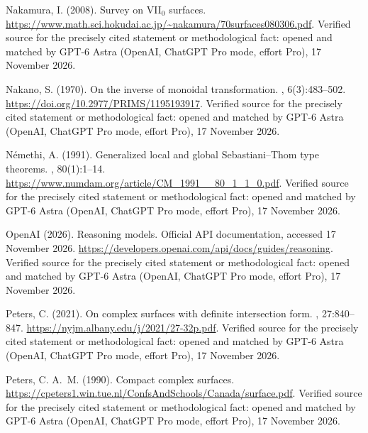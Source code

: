 \begin{thebibliography}{}
Nakamura, I. (2008).
\newblock Survey on {VII}$_0$ surfaces.
\newblock \url{https://www.math.sci.hokudai.ac.jp/~nakamura/70surfaces080306.pdf}. Verified source for the precisely cited statement or methodological fact: opened and matched by GPT-6 Astra (OpenAI, ChatGPT Pro mode, effort Pro), 17 November 2026.

Nakano, S. (1970).
\newblock On the inverse of monoidal transformation.
, 6(3):483--502.
\newblock \url{https://doi.org/10.2977/PRIMS/1195193917}. Verified source for the precisely cited statement or methodological fact: opened and matched by GPT-6 Astra (OpenAI, ChatGPT Pro mode, effort Pro), 17 November 2026.

N{\'e}methi, A. (1991).
\newblock Generalized local and global {Sebastiani--Thom} type theorems.
, 80(1):1--14.
\newblock \url{https://www.numdam.org/article/CM_1991__80_1_1_0.pdf}. Verified source for the precisely cited statement or methodological fact: opened and matched by GPT-6 Astra (OpenAI, ChatGPT Pro mode, effort Pro), 17 November 2026.

{OpenAI} (2026).
\newblock Reasoning models.
\newblock Official API documentation, accessed 17 November 2026.
\newblock \url{https://developers.openai.com/api/docs/guides/reasoning}. Verified source for the precisely cited statement or methodological fact: opened and matched by GPT-6 Astra (OpenAI, ChatGPT Pro mode, effort Pro), 17 November 2026.

Peters, C. (2021).
\newblock On complex surfaces with definite intersection form.
, 27:840--847.
\newblock \url{https://nyjm.albany.edu/j/2021/27-32p.pdf}. Verified source for the precisely cited statement or methodological fact: opened and matched by GPT-6 Astra (OpenAI, ChatGPT Pro mode, effort Pro), 17 November 2026.

Peters, C. A.~M. (1990).
\newblock Compact complex surfaces.
\newblock \url{https://cpeters1.win.tue.nl/ConfsAndSchools/Canada/surface.pdf}. Verified source for the precisely cited statement or methodological fact: opened and matched by GPT-6 Astra (OpenAI, ChatGPT Pro mode, effort Pro), 17 November 2026.


\end{thebibliography}
